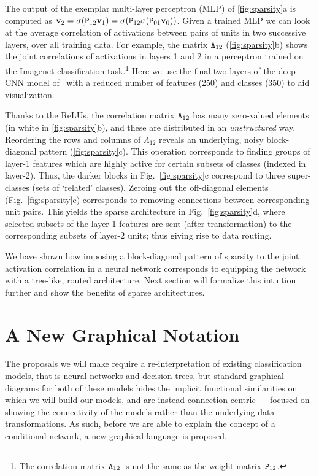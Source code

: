 \documentclass[thesis]{subfiles}
\begin{document}
	The output of the exemplar multi-layer perceptron (MLP) of \cref{fig:sparsity}a is computed as $\vec v_2 = \sigma(\mat P_{12} \vec v_1) = \sigma(\mat P_{12} \sigma(\mat P_{01} \vec v_0))$.
	Given a trained MLP we can look at the average correlation of activations between 
	pairs of units in two successive layers, over all training data. 
	For example, the matrix $\mat \Lambda_{12}$ (\cref{fig:sparsity}b) shows the joint correlations 
	of activations in layers 1 and 2 in a perceptron trained on the Imagenet classification task.\footnote{The correlation matrix $\mat \Lambda_{12}$ is not the same as the weight matrix $\mat P_{12}$.} 
	Here we use the final two layers of the deep CNN model of~\cite{Simonyan2014verydeep} with 
	a reduced number of features (250) and classes (350) to aid visualization. 

	Thanks to the ReLUs, the correlation matrix $\mat \Lambda_{12}$ has many zero-valued elements (in white in \cref{fig:sparsity}b), and these are distributed in an {\em unstructured} way. 
	Reordering the rows and columns of $\Lambda_{12}$ reveals an underlying, noisy block-diagonal pattern  (\cref{fig:sparsity}c). 
	This operation corresponds to finding groups of layer-1 features which are highly active for certain subsets of classes (indexed in layer-2).
	Thus, the darker blocks in Fig.~\cref{fig:sparsity}c correspond to three super-classes (sets of `related' classes). 
	Zeroing out the off-diagonal elements (Fig.~\cref{fig:sparsity}e) corresponds to removing connections between corresponding unit pairs. 
	This yields the sparse architecture in Fig.~\cref{fig:sparsity}d, where selected subsets of the layer-1 features are sent (after transformation) to the corresponding subsets of layer-2 units; thus giving rise to data routing.

	We have shown how imposing a block-diagonal pattern of sparsity to the joint activation correlation 
	in a neural network corresponds to equipping the network with a tree-like, 
	routed architecture. Next section will formalize this intuition further and show the benefits of 
	sparse architectures.

	\section{A New Graphical Notation}
	The proposals we will make require a re-interpretation of existing classification models, that is neural networks and decision trees, but standard graphical diagrams for both of these models hides the implicit functional similarities on which we will build our models, and are instead connection-centric --- focused on showing the connectivity of the models rather than the underlying data transformations. As such, before we are able to explain the concept of a conditional network, a new graphical language is proposed.
	
\end{document}
